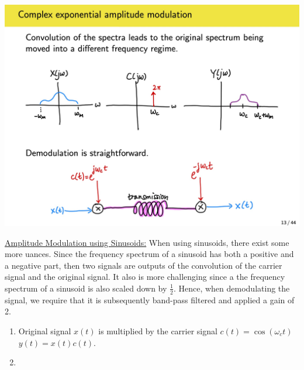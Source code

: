 \documentclass{article}
\newcommand{\sheader}[1]{\underline{#1:}}
\begin{document}
\includegraphics[scale=0.13]{exponential-modulation.jpg}

\sheader{Amplitude Modulation using Sinusoids} When using sinusoids, there exist some 
more uances. Since the frequency spectrum of a sinusoid has both a positive and 
a negative part, then two signals are outputs of the convolution of the carrier signal 
and the original signal. It also is more challenging since a the frequency spectrum of a 
sinusoid is also scaled down by $\frac{1}{2}$. Hence, when demodulating the signal,
we require that it is subsequently band-pass filtered and applied a gain of 2.

\begin{enumerate}
    \item Original signal $x(t)$ is multiplied by the carrier signal $c(t) = \cos(\omega_c t)$ $y(t) = x(t)c(t)$.
    \item 
\end{enumerate}
\end{document}
